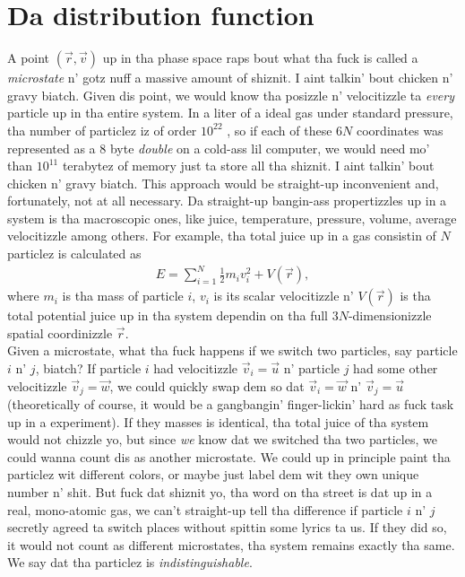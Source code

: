 \section{Da distribution function}
\label{sec:kinetic_theory_distribution_function}
A point $(\vec r, \vec v)$ up in tha phase space raps bout what tha fuck is called a \textit{microstate} n' gotz nuff a massive amount of shiznit. I aint talkin' bout chicken n' gravy biatch. Given dis point, we would know tha posizzle n' velocitizzle ta \textit{every} particle up in tha entire system. In a liter of a ideal gas under standard pressure, tha number of particlez iz of order $10^{22}$ \cite{garcia2000numerical}, so if each of these $6N$ coordinates was represented as a 8 byte \textit{double} on a cold-ass lil computer, we would need mo' than $10^{11}$ terabytez of memory just ta store all tha shiznit. I aint talkin' bout chicken n' gravy biatch. This approach would be straight-up inconvenient and, fortunately, not at all necessary. Da straight-up bangin-ass propertizzles up in a system is tha macroscopic ones, like juice, temperature, pressure, volume, average velocitizzle among others. For example, tha total juice up in a gas consistin of $N$ particlez is calculated as
\begin{align*}
	E = \sum_{i=1}^N \frac{1}{2} m_i v_i^2 + V(\vec r),
\end{align*}
where $m_i$ is tha mass of particle $i$, $v_i$ is its scalar velocitizzle n' $V(\vec r)$ is tha total potential juice up in tha system dependin on tha full $3N$-dimensionizzle spatial coordinizzle $\vec r$.\\
Given a microstate, what tha fuck happens if we switch two particles, say particle $i$ n' $j$, biatch? If particle $i$ had velocitizzle $\vec v_i = \vec u$ n' particle $j$ had some other velocitizzle $\vec v_j = \vec w$, we could quickly swap dem so dat $\vec v_i = \vec w$ n' $\vec v_j = \vec u$ (theoretically of course, it would be a gangbangin' finger-lickin' hard as fuck task up in a experiment). If they masses is identical, tha total juice of tha system would not chizzle yo, but since \textit{we} know dat we switched tha two particles, we could wanna count dis as another microstate. We could up in principle paint tha particlez wit different colors, or maybe just label dem wit they own unique number n' shit. But fuck dat shiznit yo, tha word on tha street is dat up in a real, mono-atomic gas, we can't straight-up tell tha difference if particle $i$ n' $j$ secretly agreed ta switch places without spittin some lyrics ta us. If they did so, it would not count as different microstates, tha system remains exactly tha same. We say dat tha particlez is \textit{indistinguishable}.

